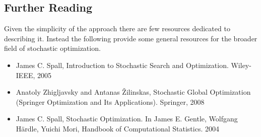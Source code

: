 \subsection{Further Reading}
Given the simplicity of the approach there are few resources dedicated to describing it. Instead the following provide some general resources for the broader field of stochastic optimization.

\begin{itemize}
	\item James C. Spall, Introduction to Stochastic Search and Optimization. Wiley-IEEE, 2005
	\item Anatoly Zhigljavsky and Antanas Žilinskas, Stochastic Global Optimization (Springer Optimization and Its Applications). Springer, 2008
	\item James C. Spall, Stochastic Optimization. In James E. Gentle, Wolfgang Härdle, Yuichi Mori, Handbook of Computational Statistics. 2004
\end{itemize}